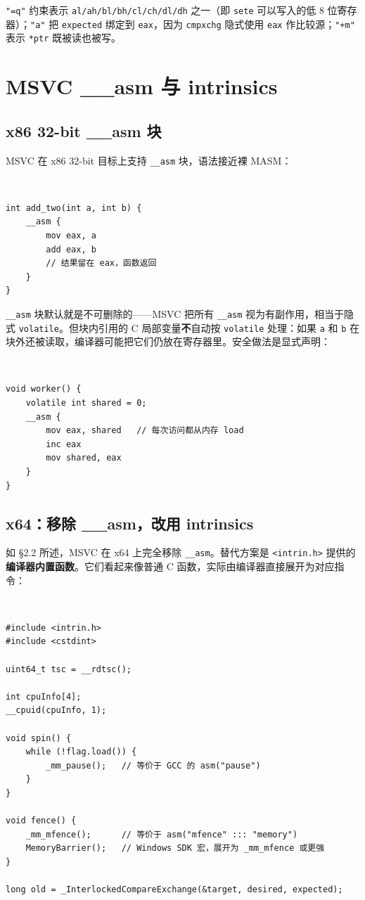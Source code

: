 \documentclass[12pt,a4paper,fontset=fandol]{ctexbook}
\newcommand{\cpplabel}{%
  \begin{tcolorbox}[enhanced,colback=cppheadbg,colframe=cppheadbg,
    arc=1mm,boxrule=0mm,left=6pt,right=6pt,top=2pt,bottom=2pt,
    halign=left,oversize]
    \textcolor{white}{\small\bfseries C++}
  \end{tcolorbox}\vspace{-4pt}}
\newcommand{\kw}[1]{\texttt{#1}}
\begin{document}
\texttt{"=q"} 约束表示 \texttt{al/ah/bl/bh/cl/ch/dl/dh} 之一（即 \texttt{sete} 可以写入的低 8 位寄存器）；\texttt{"a"} 把 \texttt{expected} 绑定到 \texttt{eax}，因为 \texttt{cmpxchg} 隐式使用 \texttt{eax} 作比较源；\texttt{"+m"} 表示 \texttt{*ptr} 既被读也被写。

\chapter{MSVC \_\_asm 与 intrinsics}\label{ch:msvc}

\section{x86 32-bit \_\_asm 块}\label{sec:msvc-asm-block}

MSVC 在 x86 32-bit 目标上支持 \texttt{\_\_asm} 块，语法接近裸 MASM：

\cpplabel
\begin{lstlisting}[style=cppstyle]
int add_two(int a, int b) {
    __asm {
        mov eax, a
        add eax, b
        // 结果留在 eax，函数返回
    }
}
\end{lstlisting}

\texttt{\_\_asm} 块默认就是不可删除的——MSVC 把所有 \texttt{\_\_asm} 视为有副作用，相当于隐式 \kw{volatile}。但块内引用的 C 局部变量\textbf{不}自动按 \kw{volatile} 处理：如果 \texttt{a} 和 \texttt{b} 在块外还被读取，编译器可能把它们仍放在寄存器里。安全做法是显式声明：

\cpplabel
\begin{lstlisting}[style=cppstyle]
void worker() {
    volatile int shared = 0;
    __asm {
        mov eax, shared   // 每次访问都从内存 load
        inc eax
        mov shared, eax
    }
}
\end{lstlisting}

\section{x64：移除 \_\_asm，改用 intrinsics}\label{sec:msvc-x64}

如 §2.2 所述，MSVC 在 x64 上完全移除 \texttt{\_\_asm}。替代方案是 \texttt{<intrin.h>} 提供的\textbf{编译器内置函数}。它们看起来像普通 C 函数，实际由编译器直接展开为对应指令：

\cpplabel
\begin{lstlisting}[style=cppstyle]
#include <intrin.h>
#include <cstdint>

uint64_t tsc = __rdtsc();

int cpuInfo[4];
__cpuid(cpuInfo, 1);

void spin() {
    while (!flag.load()) {
        _mm_pause();   // 等价于 GCC 的 asm("pause")
    }
}

void fence() {
    _mm_mfence();      // 等价于 asm("mfence" ::: "memory")
    MemoryBarrier();   // Windows SDK 宏，展开为 _mm_mfence 或更强
}

long old = _InterlockedCompareExchange(&target, desired, expected);
\end{lstlisting}
\end{document}
